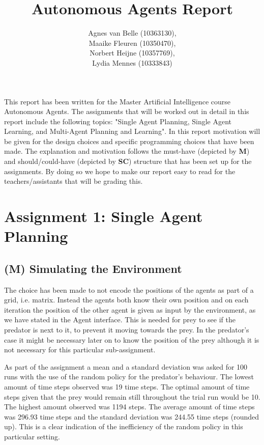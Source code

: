 \documentclass{article}
\begin{document}
\title{Autonomous Agents Report}
\author{Agnes van Belle (10363130), \\Maaike Fleuren (10350470), \\Norbert Heijne (10357769), \\Lydia Mennes (10333843)}
\maketitle

This report has been written for the Master Artificial Intelligence course Autonomous Agents. The assignments that will be worked out in detail in this report include the following topics: "Single Agent Planning, Single Agent Learning, and Multi-Agent Planning and Learning". In this report motivation will be given for the design choices and specific programming choices that have been made. The explanation and motivation follows the must-have (depicted by \textbf{M}) and should/could-have (depicted by \textbf{SC}) structure that has been set up for the assignments. By doing so we hope to make our report easy to read for the teachers/assistants that will be grading this.

\section{Assignment 1: Single Agent Planning}

\subsection{(M) Simulating the Environment}
The choice has been made to not encode the positions of the agents as part of a grid, i.e. matrix. Instead the agents both know their own position and on each iteration the position of the other agent is given as input by the environment, as we have stated in the Agent interface. This is needed for prey to see if the predator is next to it, to prevent it moving towards the prey. In the predator's case it might be necessary later on to know the position of the prey although it is not necessary for this particular sub-assignment.

As part of the assignment a mean and a standard deviation was asked for 100 runs with the use of the random policy for the predator's behaviour. The lowest amount of time steps observed was 19 time steps. The optimal amount of time steps given that the prey would remain still throughout the trial run would be 10. The highest amount observed was 1194 steps. The average amount of time steps was 296.93 time steps and the standard deviation was 244.55 time steps (rounded up). This is a clear indication of the inefficiency of the random policy in this particular setting. 
\end{document}
